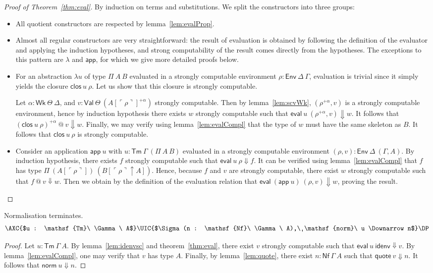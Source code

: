 \documentclass[a4paper,english]{lipics-v2019}
\newcommand{\agdaSymb}[1]{\mathsf{#1}}
\newcommand{\Tm}{\agdaSymb{Tm}}
\newcommand{\app}{\agdaSymb{app}}
\newcommand{\lam}{\lambda}
\newcommand{\Vars}{\agdaSymb{Wk}}
\newcommand{\Val}{\agdaSymb{Val}}
\newcommand{\Env}{\agdaSymb{Env}}
\newcommand{\clos}{\agdaSymb{clos}}
\newcommand{\idenv}{\agdaSymb{idenv}}
\newcommand{\Nf}{\agdaSymb{Nf}}
\newcommand{\eval}{\agdaSymb{eval}}
\newcommand{\q}{\agdaSymb{quote}}
\newcommand{\norm}{\agdaSymb{norm}}
\newcommand{\cul}{\ulcorner}
\newcommand{\cur}{\urcorner}
\newcommand{\Da}{\Downarrow}
\newcommand{\lift}{\!\uparrow\!}
\begin{document}
\begin{proof}[Proof of Theorem~\ref{thm:eval}]
  By induction on terms and substitutions. We split the constructors into three
  groups:
  \begin{itemize}
  \item All quotient constructors are respected by lemma~\ref{lem:evalProp}.
  \item Almost all regular constructors are very straightforward: the result of
    evaluation is obtained by following the definition of the evaluator and
    applying the induction hypotheses, and strong computability of the result
    comes directly from the hypotheses. The exceptions to this pattern are $\lam$
    and $\app$, for which we give more detailed proofs below.
  \item For an abstraction $\lam u$ of type $\Pi\ A\ B$ evaluated in a strongly
    computable environment $\rho : \Env\ \Delta\ \Gamma$, evaluation is trivial
    since it simply yields the closure $\clos\ u\ \rho$. Let us show that this
    closure is strongly computable.

    Let $\alpha : \Vars\ \Theta\ \Delta$, and $v : \Val\ \Theta\ (A[\cul \rho \cur]^{+\alpha})$
    strongly computable. Then by lemma~\ref{lem:scvWk}, $(\rho^{+\alpha},v)$ is
    a strongly computable environment, hence by induction hypothesis there exists
    $w$ strongly computable such that $\eval\ u\ (\rho^{+\alpha},v) \Da w$.
    It follows that $(\clos\ u\ \rho)^{+\alpha}\ @\ v \Da w$. Finally, we
    may verify using lemma~\ref{lem:evalCompl} that the type of $w$ must have
    the same skeleton as $B$. It follows that $\clos\ u\ \rho$ is strongly
    computable.
  \item Consider an application $\app\ u$ with $u : \Tm\ \Gamma\ (\Pi\ A\ B)$
    evaluated in a strongly computable environment $(\rho,v) : \Env\ \Delta\ (\Gamma,A)$.
    By induction hypothesis, there exists $f$ strongly computable such that
    $\eval\ u\ \rho \Da f$. It can be verified using lemma~\ref{lem:evalCompl}
    that $f$ has type $\Pi\ (A[\cul \rho \cur])\ (B[\cul \rho \cur \lift A])$.
    Hence, because $f$ and $v$ are strongly computable, there exist $w$ strongly
    computable such that $f\ @\ v \Da w$. Then we obtain by the definition of
    the evaluation relation that $\eval\ (\app\ u)\ (\rho,v) \Da w$, proving
    the result.
  \end{itemize}
\end{proof}

\begin{theorem}[Termination]
  \label{thm:termination}
  Normalisation terminates.
  \[ \AXC{$u : \Tm\ \Gamma\ A$}\UIC{$\Sigma(n : \Nf\ \Gamma\ A),\ \norm\ u \Da n$}\DP \]
\end{theorem}
\begin{proof}
  Let $u : \Tm\ \Gamma\ A$. By lemma~\ref{lem:idenvsc} and theorem~\ref{thm:eval},
  there exist $v$ strongly computable such that $\eval\ u\ \idenv \Da v$.
  By lemma~\ref{lem:evalCompl}, one may verify that $v$ has type $A$.
  Finally, by lemma~\ref{lem:quote}, there exist $n : \Nf\ \Gamma\ A$ such that
  $\q\ v \Da n$. It follows that $\norm\ u \Da n$.
\end{proof}
\end{document}

